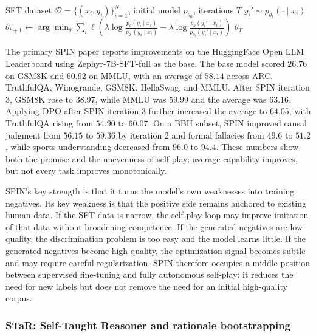 \begin{algorithm}[t]
\caption{Self-Play Fine-Tuning (SPIN)}
\label{alg:spin}
\begin{algorithmic}[1]
\Require SFT dataset $\mathcal{D}=\{(x_i,y_i)\}_{i=1}^{N}$, initial model $p_{\theta_0}$, iterations $T$
        \State $y_i' \sim p_{\theta_t}(\cdot\mid x_i)$
    \EndFor
    \State $\theta_{t+1}\gets\arg\min_\theta \sum_i \ell\left(\lambda\log\frac{p_\theta(y_i\mid x_i)}{p_{\theta_t}(y_i\mid x_i)}-\lambda\log\frac{p_\theta(y_i'\mid x_i)}{p_{\theta_t}(y_i'\mid x_i)}\right)$
\EndFor
\State \Return $\theta_T$
\end{algorithmic}
\end{algorithm}

The primary SPIN paper reports improvements on the HuggingFace Open LLM Leaderboard using Zephyr-7B-SFT-full as the base. The base model scored $26.76$ on GSM8K \cite{gsm8k2021} and $60.92$ on MMLU, with an average of $58.14$ across ARC, TruthfulQA, Winogrande, GSM8K, HellaSwag, and MMLU. After SPIN iteration 3, GSM8K rose to $38.97$, while MMLU was $59.99$ and the average was $63.16$. Applying DPO after SPIN iteration 3 further increased the average to $64.05$, with TruthfulQA rising from $54.90$ to $60.07$. On a BBH subset, SPIN improved causal judgment from $56.15$ to $59.36$ by iteration 2 and formal fallacies from $49.6$ to $51.2$, while sports understanding decreased from $96.0$ to $94.4$. These numbers show both the promise and the unevenness of self-play: average capability improves, but not every task improves monotonically.

SPIN's key strength is that it turns the model's own weaknesses into training negatives. Its key weakness is that the positive side remains anchored to existing human data. If the SFT data is narrow, the self-play loop may improve imitation of that data without broadening competence. If the generated negatives are low quality, the discrimination problem is too easy and the model learns little. If the generated negatives become high quality, the optimization signal becomes subtle and may require careful regularization. SPIN therefore occupies a middle position between supervised fine-tuning and fully autonomous self-play: it reduces the need for new labels but does not remove the need for an initial high-quality corpus.

\subsubsection{STaR: Self-Taught Reasoner and rationale bootstrapping}
\label{subsubsec:star}

